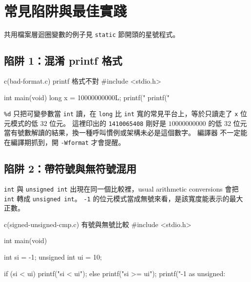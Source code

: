 \section{常見陷阱與最佳實踐}
\label{sec:decl-pitfalls}

共用檔案層迴圈變數的例子見 \texttt{static} 節開頭的星號程式。

\subsection{陷阱 1：混淆 printf 格式}

\begin{example}{c}{(bad-format.c) printf 格式不對}
#include <stdio.h>

int main(void) {
    long x = 10000000000L;
    printf("%
    printf("%
}
\end{example}



\texttt{\%d} 只把可變參數當 \texttt{int} 讀，在 \texttt{long} 比
\texttt{int} 寬的常見平台上，等於只讀走了 \texttt{x} 位元模式的低 $32$
位元。 這裡印出的 \texttt{1410065408} 剛好是 $10000000000$ 的低 $32$
位元當有號數解讀的結果，換一種呼叫慣例或架構未必是這個數字。 編譯器
不一定能在編譯期抓到，開 \texttt{-Wformat} 才會提醒。

\subsection{陷阱 2：帶符號與無符號混用}

\texttt{int} 與 \texttt{unsigned int} 出現在同一個比較裡，usual
arithmetic conversions 會把 \texttt{int} 轉成 \texttt{unsigned int}。
\texttt{-1} 的位元模式當成無號來看，是該寬度能表示的最大正數。

\begin{example}{c}{(signed-unsigned-cmp.c) 有號與無號比較}
#include <stdio.h>

int main(void) {
    int si = -1;
    unsigned int ui = 10;

    if (si < ui) {
        printf("si < ui\n");
    } else {
        printf("si >= ui\n");
    }
    printf("-1 as unsigned: %
}
\end{example}

